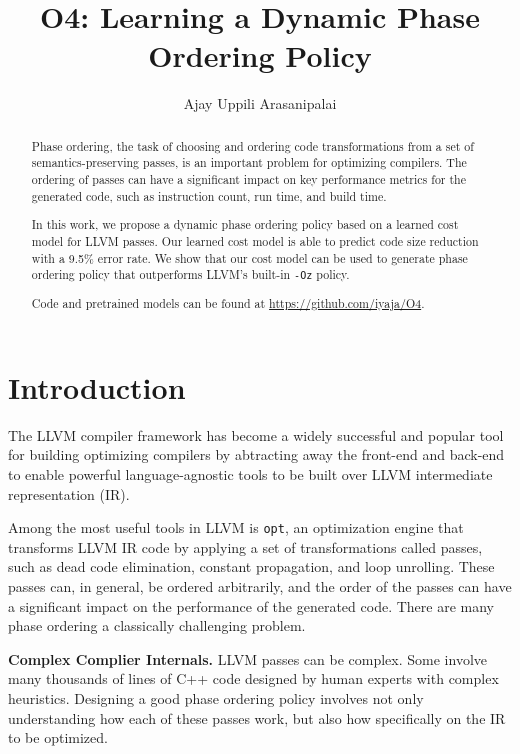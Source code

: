 \documentclass[conference]{IEEEtran}
\title{O4: Learning a Dynamic Phase Ordering Policy}
\author{Ajay Uppili Arasanipalai}
\begin{document}
\maketitle
\thispagestyle{firstpage}
\pagestyle{plain}




\begin{abstract}

  Phase ordering, the task of choosing and ordering code transformations from a
  set of semantics-preserving passes, is an important problem for optimizing
  compilers. The ordering of passes can have a significant impact on key
  performance metrics for the generated code, such as instruction count, run
  time, and build time.

  In this work, we propose a dynamic phase ordering policy based on a learned
  cost model for LLVM passes. Our learned cost model is able to predict code
  size reduction with a 9.5\% error rate. We show that our cost model can be
  used to generate phase ordering policy that outperforms LLVM's built-in
  \texttt{-Oz} policy.

  Code and pretrained models can be found at \url{https://github.com/iyaja/O4}.

\end{abstract}

\section{Introduction}

The LLVM \cite{lattner2004llvm} compiler framework has become a widely
successful and popular tool for building optimizing compilers by abtracting away
the front-end and back-end to enable powerful language-agnostic tools to be
built over LLVM intermediate representation (IR).

Among the most useful tools in LLVM is \texttt{opt}, an optimization engine
that transforms LLVM IR code by applying a set of transformations called passes,
such as dead code elimination, constant propagation, and loop unrolling. These
passes can, in general, be ordered arbitrarily, and the order of the passes can
have a significant impact on the performance of the generated code. There are
many phase ordering a classically challenging problem.

\textbf{Complex Complier Internals.} LLVM passes can be complex. Some involve
many thousands of lines of C++ code designed by human experts with complex
heuristics. Designing a good phase ordering policy involves not only
understanding how each of these passes work, but also how specifically on the IR
to be optimized.
\end{document}
